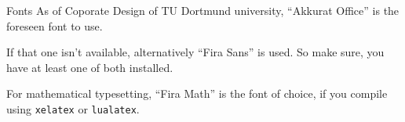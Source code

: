 \documentclass[aspectratio=1610, 9pt]{beamer}
\begin{document}
\begin{frame}{Fonts}
  As of Coporate Design of TU Dortmund university, \enquote{Akkurat Office} is the foreseen font to use.

  If that one isn't available, alternatively \enquote{Fira Sans} is used.
  So make sure, you have at least one of both installed.
  
  For mathematical typesetting, \enquote{Fira Math} is the font of choice, if you compile using \texttt{xelatex} or \texttt{lualatex}.
\end{frame}
\end{document}
